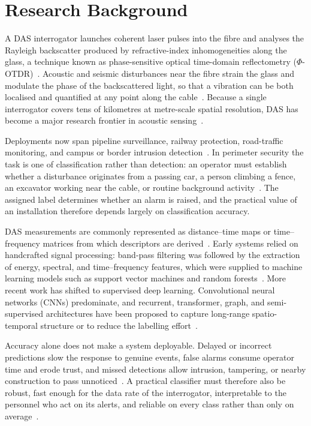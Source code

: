 \section{Research Background}
\label{sec:ResearchBackground}
A DAS interrogator launches coherent laser pulses into the fibre and analyses the Rayleigh backscatter produced by refractive-index inhomogeneities along the glass, a technique known as phase-sensitive optical time-domain reflectometry ($\Phi$-OTDR)~\cite{he2021review,liu2025advances}. Acoustic and seismic disturbances near the fibre strain the glass and modulate the phase of the backscattered light, so that a vibration can be both localised and quantified at any point along the cable~\cite{hartog2017introduction}. Because a single interrogator covers tens of kilometres at metre-scale spatial resolution, DAS has become a major research frontier in acoustic sensing~\cite{shang2022das}.

Deployments now span pipeline surveillance, railway protection, road-traffic monitoring, and campus or border intrusion detection~\cite{wu2024pipeline,yurekli2025railway,deng2025roadtraffic,juarez2005intrusion}. In perimeter security the task is one of classification rather than detection: an operator must establish whether a disturbance originates from a passing car, a person climbing a fence, an excavator working near the cable, or routine background activity~\cite{tomasov2025perimeter}. The assigned label determines whether an alarm is raised, and the practical value of an installation therefore depends largely on classification accuracy.

DAS measurements are commonly represented as distance--time maps or time--frequency matrices from which descriptors are derived~\cite{kandamali2022ml}. Early systems relied on handcrafted signal processing: band-pass filtering was followed by the extraction of energy, spectral, and time--frequency features, which were supplied to machine learning models such as support vector machines and random forests~\cite{bublin2021event,breiman2001randomforests}. More recent work has shifted to supervised deep learning. Convolutional neural networks (CNNs) predominate, and recurrent, transformer, graph, and semi-supervised architectures have been proposed to capture long-range spatio-temporal structure or to reduce the labelling effort~\cite{tomasov2023enhancing,li2020convlstm,dione2025intrusion,jeong2026s2dygnn,kang2024semisupervised}.

Accuracy alone does not make a system deployable. Delayed or incorrect predictions slow the response to genuine events, false alarms consume operator time and erode trust, and missed detections allow intrusion, tampering, or nearby construction to pass unnoticed~\cite{han2024intrusion}. A practical classifier must therefore also be robust, fast enough for the data rate of the interrogator, interpretable to the personnel who act on its alerts, and reliable on every class rather than only on average~\cite{deng2025roadtraffic,yurekli2025railway}.

